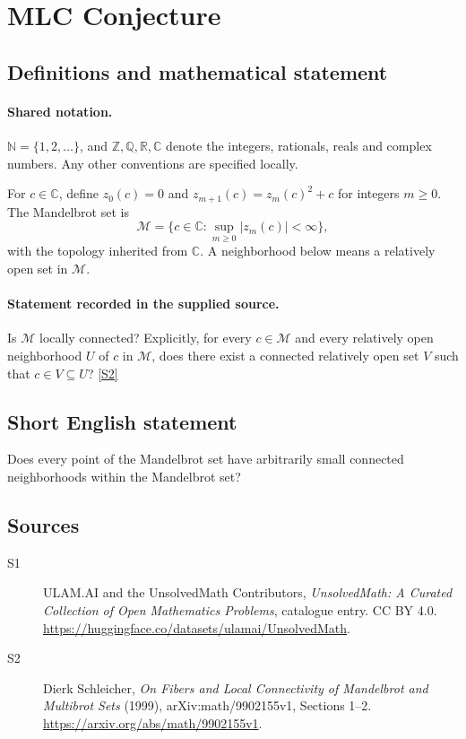 \documentclass[11pt]{article}
\newcommand{\sref}[2]{\hyperlink{source:#1:#2}{[S#2]}}
\begin{document}
\section{MLC Conjecture}\label{statement}

\subsection{Definitions and mathematical statement}

\paragraph{Shared notation.}$\mathbb N=\{1,2,\ldots\}$, and $\mathbb Z,\mathbb Q,\mathbb R,\mathbb C$ denote the integers, rationals, reals and complex numbers. Any other conventions are specified locally.


For $c\in\mathbb C$, define $z_0(c)=0$ and $z_{m+1}(c)=z_m(c)^2+c$ for integers $m\ge0$. The Mandelbrot set is
\[
 \mathcal M=\{c\in\mathbb C:\sup_{m\ge0}|z_m(c)|<\infty\},
\]
with the topology inherited from $\mathbb C$. A neighborhood below means a relatively open set in $\mathcal M$.
\paragraph{Statement recorded in the supplied source.}
Is $\mathcal M$ locally connected? Explicitly, for every $c\in\mathcal M$ and every relatively open neighborhood $U$ of $c$ in $\mathcal M$, does there exist a connected relatively open set $V$ such that $c\in V\subseteq U$? \sref{statement}{2}
\subsection{Short English statement}
Does every point of the Mandelbrot set have arbitrarily small connected neighborhoods within the Mandelbrot set?
\subsection{Sources}
\begin{description}
\item[\hypertarget{source:statement:1}{S1}] ULAM.AI and the UnsolvedMath Contributors, \emph{UnsolvedMath: A Curated Collection of Open Mathematics Problems}, catalogue entry. CC BY 4.0. \url{https://huggingface.co/datasets/ulamai/UnsolvedMath}.
\item[\hypertarget{source:statement:2}{S2}] Dierk Schleicher, \emph{On Fibers and Local Connectivity of Mandelbrot and Multibrot Sets} (1999), arXiv:math/9902155v1, Sections 1--2. \url{https://arxiv.org/abs/math/9902155v1}.
\end{description}
\label{end:statement}
\end{document}
